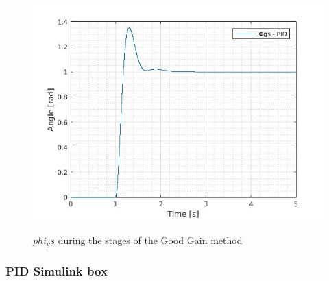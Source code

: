 \begin{figure}[H]
{\includegraphics[scale=0.29]{figures/GG3.jpg}
\label{fig:subim12}}
\hfill
{}
\hfill
{}
\hfill

\caption{$phi{_gs}$ during the stages of the Good Gain method}

\end{figure}



  
  \subsubsection{PID Simulink box}